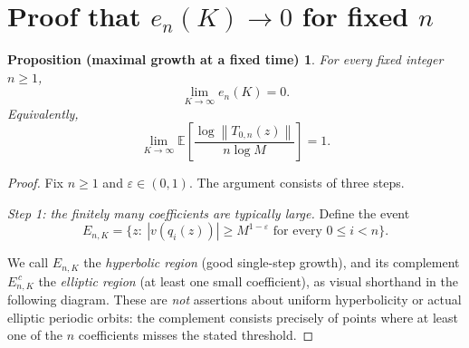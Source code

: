 \documentclass[11pt,a4paper]{article}
\newtheorem*{fixedgrowth}{Proposition (maximal growth at a fixed time)}
\newcommand{\EE}{\mathbb{E}}
\newcommand{\norm}[1]{\left\lVert #1\right\rVert}
\begin{document}
\section{Proof that $e_n(K)\to0$ for fixed $n$}\label{sec:fixed}

\begin{fixedgrowth}
For every fixed integer $n\ge1$,
\begin{equation}\label{eq:claim}
 \boxed{\lim_{K\to\infty}e_n(K)=0.}
\end{equation}
Equivalently,
\[
 \lim_{K\to\infty}\EE\left[\frac{\log\norm{T_{0,n}(z)}}{n\log M}\right]=1.
\]
\end{fixedgrowth}

\begin{proof}
Fix $n\ge1$ and $\varepsilon\in(0,1)$. The argument consists of three steps.

\smallskip
\noindent\emph{Step 1: the finitely many coefficients are typically large.}
Define the event
\begin{equation}\label{eq:event}
 E_{n,K}=\bigl\{z:\ |v(q_i(z))|\ge M^{1-\varepsilon}\text{ for every }0\le i<n\bigr\}.
\end{equation}

We call $E_{n,K}$ the \emph{hyperbolic region} (good single-step growth),
and its complement $E_{n,K}^{\,c}$ the \emph{elliptic region} (at least one
small coefficient), as visual shorthand in the following diagram. These are
\emph{not} assertions about uniform hyperbolicity or actual elliptic periodic
orbits: the complement consists precisely of points where at least one of the
$n$ coefficients misses the stated threshold.


\end{proof}
\end{document}

